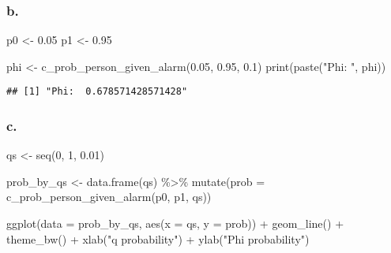 \documentclass[
]{article}
\newenvironment{Shaded}{\begin{snugshade}}{\end{snugshade}}
\newcommand{\AttributeTok}[1]{\textcolor[rgb]{0.77,0.63,0.00}{#1}}
\newcommand{\DecValTok}[1]{\textcolor[rgb]{0.00,0.00,0.81}{#1}}
\newcommand{\FloatTok}[1]{\textcolor[rgb]{0.00,0.00,0.81}{#1}}
\newcommand{\FunctionTok}[1]{\textcolor[rgb]{0.00,0.00,0.00}{#1}}
\newcommand{\NormalTok}[1]{#1}
\newcommand{\OtherTok}[1]{\textcolor[rgb]{0.56,0.35,0.01}{#1}}
\newcommand{\SpecialCharTok}[1]{\textcolor[rgb]{0.00,0.00,0.00}{#1}}
\newcommand{\StringTok}[1]{\textcolor[rgb]{0.31,0.60,0.02}{#1}}
\begin{document}
\hypertarget{b.}{%
\subsubsection{b.}\label{b.}}

\begin{Shaded}
\begin{Highlighting}[]
\NormalTok{p0 }\OtherTok{\textless{}{-}} \FloatTok{0.05}
\NormalTok{p1 }\OtherTok{\textless{}{-}} \FloatTok{0.95}

\NormalTok{phi }\OtherTok{\textless{}{-}} \FunctionTok{c\_prob\_person\_given\_alarm}\NormalTok{(}\FloatTok{0.05}\NormalTok{, }\FloatTok{0.95}\NormalTok{, }\FloatTok{0.1}\NormalTok{)}
\FunctionTok{print}\NormalTok{(}\FunctionTok{paste}\NormalTok{(}\StringTok{"Phi: "}\NormalTok{, phi))}
\end{Highlighting}
\end{Shaded}

\begin{verbatim}
## [1] "Phi:  0.678571428571428"
\end{verbatim}

\hypertarget{c.}{%
\subsubsection{c.}\label{c.}}

\begin{Shaded}
\begin{Highlighting}[]
\NormalTok{qs }\OtherTok{\textless{}{-}} \FunctionTok{seq}\NormalTok{(}\DecValTok{0}\NormalTok{, }\DecValTok{1}\NormalTok{, }\FloatTok{0.01}\NormalTok{)}

\NormalTok{prob\_by\_qs }\OtherTok{\textless{}{-}} \FunctionTok{data.frame}\NormalTok{(qs) }\SpecialCharTok{\%\textgreater{}\%}
  \FunctionTok{mutate}\NormalTok{(}\AttributeTok{prob =} \FunctionTok{c\_prob\_person\_given\_alarm}\NormalTok{(p0, p1, qs))}

\FunctionTok{ggplot}\NormalTok{(}\AttributeTok{data =}\NormalTok{ prob\_by\_qs, }\FunctionTok{aes}\NormalTok{(}\AttributeTok{x =}\NormalTok{ qs, }\AttributeTok{y =}\NormalTok{ prob)) }\SpecialCharTok{+} \FunctionTok{geom\_line}\NormalTok{() }\SpecialCharTok{+} \FunctionTok{theme\_bw}\NormalTok{() }\SpecialCharTok{+} \FunctionTok{xlab}\NormalTok{(}\StringTok{"q probability"}\NormalTok{) }\SpecialCharTok{+} \FunctionTok{ylab}\NormalTok{(}\StringTok{"Phi probability"}\NormalTok{)}
\end{Highlighting}
\end{Shaded}
\end{document}

